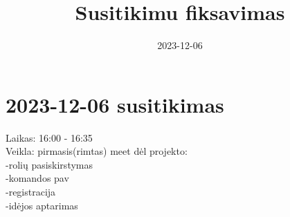 \documentclass{article}
\title{Susitikimu fiksavimas}
\date{2023-12-06}
\begin{document}
\maketitle

    \section*{2023-12-06 susitikimas}
    Laikas: 16:00 - 16:35\\
    Veikla: pirmasis(rimtas) meet dėl projekto:\\
    -rolių pasiskirstymas\\
    -komandos pav\\
    -registracija\\
    -idėjos aptarimas\\
    
\end{document}
